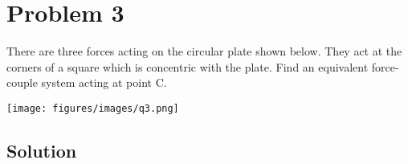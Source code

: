 \section*{Problem 3}

There are three forces acting on the circular plate shown below.
They act at the corners of a square which is concentric with the plate.
Find an equivalent force-couple system acting at point C.

\begin{figure*}[h]
    \centering
    \texttt{[image: figures/images/q3.png]}
\end{figure*}

\subsection*{Solution}
